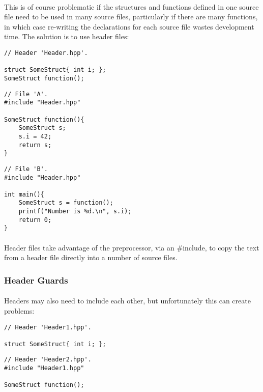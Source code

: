 \documentclass[12pt,twoside,notitlepage]{report}
\begin{document}
\paragraph{}
This is of course problematic if the structures and functions defined in one source file need to be used in many source files, particularly if there are many functions, in which case re-writing the declarations for each source file wastes development time. The solution is to use header files:

\begin{lstlisting}
// Header 'Header.hpp'.

struct SomeStruct{ int i; };
SomeStruct function();
\end{lstlisting}

\begin{lstlisting}
// File 'A'.
#include "Header.hpp"

SomeStruct function(){
	SomeStruct s;
	s.i = 42;
	return s;
}
\end{lstlisting}

\begin{lstlisting}
// File 'B'.
#include "Header.hpp"

int main(){
	SomeStruct s = function();
	printf("Number is %d.\n", s.i);
	return 0;
}
\end{lstlisting}

\paragraph{}
Header files take advantage of the preprocessor, via an \#include, to copy the text from a header file directly into a number of source files.

\subsubsection{Header Guards}

\paragraph{}
Headers may also need to include each other, but unfortunately this can create problems:

\begin{lstlisting}
// Header 'Header1.hpp'.

struct SomeStruct{ int i; };
\end{lstlisting}

\begin{lstlisting}
// Header 'Header2.hpp'.
#include "Header1.hpp"

SomeStruct function();
\end{lstlisting}
\end{document}
